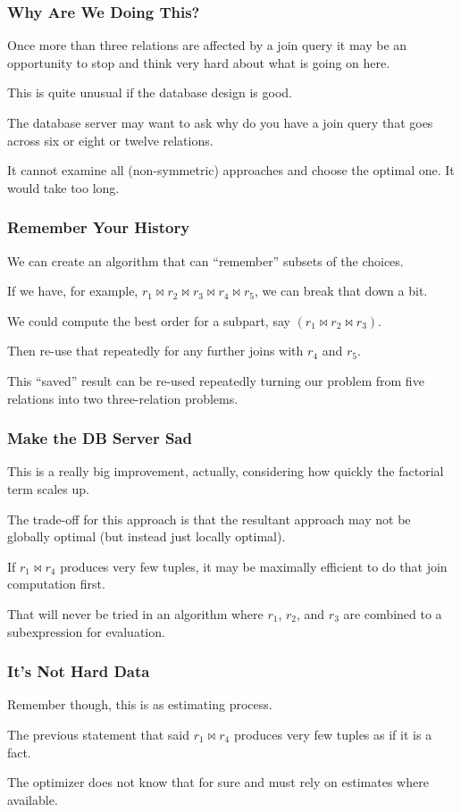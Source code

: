 \begin{frame}
\frametitle{Why Are We Doing This?}

Once more than three relations are affected by a join query it may be an opportunity to stop and think very hard about what is going on here. 

This is quite unusual if the database design is good. 

The database server may want to ask why do you have a join query that goes across six or eight or twelve relations. 

It cannot examine all (non-symmetric) approaches and choose the optimal one. It would take too long.

\end{frame}


\begin{frame}
\frametitle{Remember Your History}

We can create an algorithm that can ``remember'' subsets of the choices. 

If we have, for example, $r_{1} \bowtie r_{2} \bowtie r_{3} \bowtie r_{4} \bowtie r_{5}$, we can break that down a bit. 

We could compute the best order for a subpart, say $(r_{1} \bowtie r_{2} \bowtie r_{3})$. 

Then re-use that repeatedly for any further joins with $r_{4}$ and $r_{5}$. 

This ``saved'' result can be re-used repeatedly turning our problem from five relations into two three-relation problems.

\end{frame}

\begin{frame}
\frametitle{Make the DB Server Sad}

This is a really big improvement, actually, considering how quickly the factorial term scales up. 

The trade-off for this approach is that the resultant approach may not be globally optimal (but instead just locally optimal). 

If $r_{1} \bowtie r_{4}$ produces very few tuples, it may be maximally efficient to do that join computation first.

That will never be tried in an algorithm where $r_{1}$, $r_{2}$, and $r_{3}$ are combined to a subexpression for evaluation. 

\end{frame}

\begin{frame}
\frametitle{It's Not Hard Data}

Remember though, this is as estimating process. 

The previous statement that said $r_{1} \bowtie r_{4}$ produces very few tuples as if it is a fact. 

The optimizer does not know that for sure and must rely on estimates where available. 


\end{frame}

